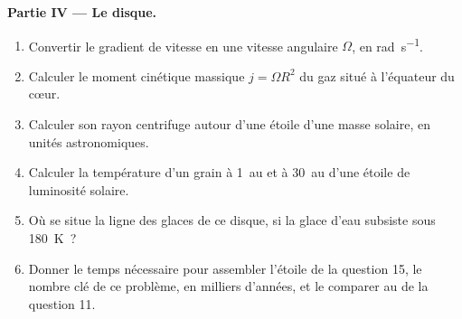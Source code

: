 \begin{problem}
\noindent\textbf{Partie IV --- Le disque.}
\begin{enumerate}[resume]
  \item Convertir le gradient de vitesse en une vitesse angulaire $\Omega$, en
        \unit{rad.s^{-1}}.
  \item Calculer le moment cinétique massique $j = \Omega R^2$ du gaz situé à l'équateur
        du cœur.
  \item Calculer son rayon centrifuge autour d'une étoile d'une masse solaire, en
        unités astronomiques.
  \item Calculer la température d'un grain à \qty{1}{au} et à \qty{30}{au}
        d'une étoile de luminosité solaire.
  \item Où se situe la ligne des glaces de ce disque, si la glace d'eau subsiste sous
        \qty{180}{K}~?
  \item Donner le temps nécessaire pour assembler l'étoile de la question 15, le nombre
        clé de ce problème, en milliers d'années, et le comparer au 
        de la question 11.
\end{enumerate}
\end{problem}
